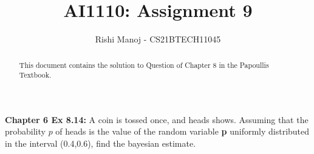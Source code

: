 \documentclass[journal,12pt,twocolumn]{IEEEtran}
\begin{document}
	
	
	\providecommand{\mbf}{\mathbf}
	\providecommand{\pr}[1]{\ensuremath{\Pr\left(#1\right)}}
	\providecommand{\qfunc}[1]{\ensuremath{Q\left(#1\right)}}
	\providecommand{\sbrak}[1]{\ensuremath{{}\left[#1\right]}}
	\providecommand{\lsbrak}[1]{\ensuremath{{}\left[#1\right.}}
	\providecommand{\rsbrak}[1]{\ensuremath{{}\left.#1\right]}}
	\providecommand{\brak}[1]{\ensuremath{\left(#1\right)}}
	\providecommand{\lbrak}[1]{\ensuremath{\left(#1\right.}}
	\providecommand{\rbrak}[1]{\ensuremath{\left.#1\right)}}
	\providecommand{\cbrak}[1]{\ensuremath{\left\{#1\right\}}}
	\providecommand{\lcbrak}[1]{\ensuremath{\left\{#1\right.}}
	\providecommand{\rcbrak}[1]{\ensuremath{\left.#1\right\}}}
	\providecommand{\dec}[2]{\ensuremath{\overset{#1}{\underset{#2}{\gtrless}}}}
	\newcommand{\myvec}[1]{\ensuremath{\begin{pmatrix}#1\end{pmatrix}}}
	\newcommand{\mydet}[1]{\ensuremath{\begin{vmatrix}#1\end{vmatrix}}}
	\newcommand*{\permcomb}[4][0mu]{{{}^{#3}\mkern#1#2_{#4}}}
	\newcommand*{\perm}[1][-3mu]{\permcomb[#1]{P}}
	\newcommand*{\comb}[1][-1mu]{\permcomb[#1]{C}}
		\title{
				AI1110: Assignment 9
		}
		\author{
			Rishi Manoj - CS21BTECH11045
		}
			
	\maketitle
	\begin{abstract}
		This document contains the solution to Question of Chapter 8 in the Papoullis Textbook.
	\end{abstract}
	
	\textbf{Chapter 6 Ex 8.14:}
	A coin is tossed once, and heads shows. Assuming that the probability $p$ of heads is the value of the random variable \textbf{p} uniformly distributed in the interval (0.4,0.6), find the bayesian estimate.
	
\end{document}
